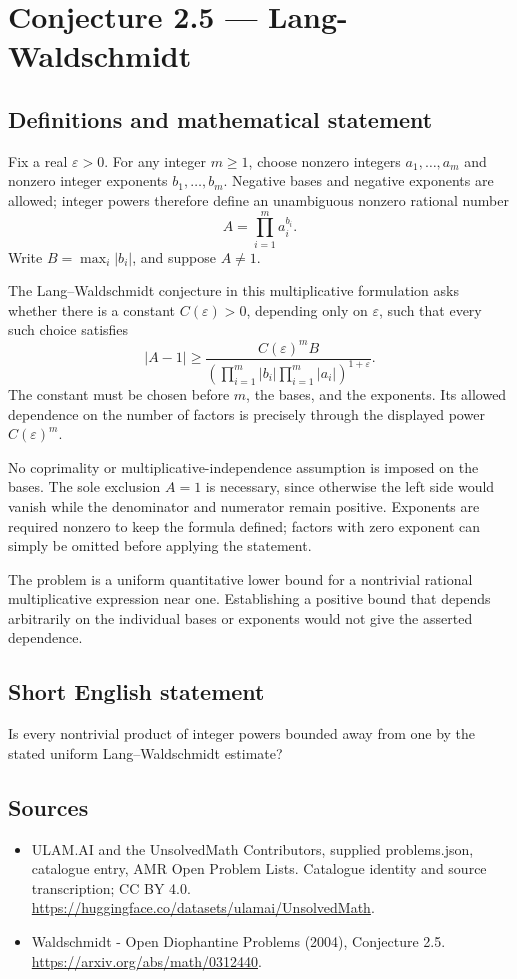 \documentclass[11pt,a4paper]{article}
\begin{document}
\section*{Conjecture 2.5 — Lang-Waldschmidt}\label{statement}

\subsection{Definitions and mathematical statement}
Fix a real $\varepsilon>0$. For any integer $m\ge1$, choose nonzero integers $a_1,\ldots,a_m$ and nonzero integer exponents $b_1,\ldots,b_m$. Negative bases and negative exponents are allowed; integer powers therefore define an unambiguous nonzero rational number
\[
A=\prod_{i=1}^m a_i^{b_i}.
\]
Write $B=\max_i|b_i|$, and suppose $A\ne1$.

The Lang--Waldschmidt conjecture in this multiplicative formulation asks whether there is a constant $C(\varepsilon)>0$, depending only on $\varepsilon$, such that every such choice satisfies
\[
|A-1|\ge
\frac{C(\varepsilon)^m B}
 {\left(\prod_{i=1}^m|b_i|\prod_{i=1}^m|a_i|\right)^{1+\varepsilon}}.
\]
The constant must be chosen before $m$, the bases, and the exponents. Its allowed dependence on the number of factors is precisely through the displayed power $C(\varepsilon)^m$.

No coprimality or multiplicative-independence assumption is imposed on the bases. The sole exclusion $A=1$ is necessary, since otherwise the left side would vanish while the denominator and numerator remain positive. Exponents are required nonzero to keep the formula defined; factors with zero exponent can simply be omitted before applying the statement.

The problem is a uniform quantitative lower bound for a nontrivial rational multiplicative expression near one. Establishing a positive bound that depends arbitrarily on the individual bases or exponents would not give the asserted dependence.
\subsection{Short English statement}
Is every nontrivial product of integer powers bounded away from one by the stated uniform Lang–Waldschmidt estimate?
\subsection{Sources}
\begin{itemize}
\item[S1] ULAM.AI and the UnsolvedMath Contributors, supplied problems.json, catalogue entry, AMR Open Problem Lists. Catalogue identity and source transcription; CC BY 4.0.
\url{https://huggingface.co/datasets/ulamai/UnsolvedMath}.
\item[S2] Waldschmidt - Open Diophantine Problems (2004), Conjecture 2.5. 
\url{https://arxiv.org/abs/math/0312440}.
\end{itemize}
\end{document}
